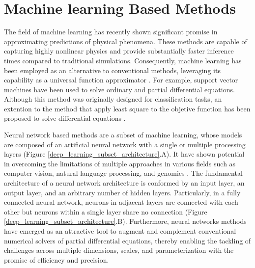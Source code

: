 \documentclass[11pt,twoside]{article}
\begin{document}
\section{Machine learning Based Methods}\label{sec:machine_learning_methods}

The field of machine learning has recently shown significant promise in approximating predictions of physical 
phenomena. These methods are capable of capturing highly nonlinear physics and provide substantially faster inference 
times compared to traditional simulations. Consequently, machine learning has been employed as an alternative to 
conventional methods, leveraging its capability as a universal function approximator \citep{hornik_approximation_1991}.
For example, support vector machines have been used to solve ordinary and partial differential equations. Although 
this method was originally designed for classification tasks, an extention to the method that apply least square to 
the objetive function has been proposed to solve differential equations \citep{mehrkanoon_approximate_2012,
mehrkanoon_learning_2015}.

Neural network based methods are a subset of machine learning, whose models are composed of an artificial neural 
network with a single or multiple processing layers (Figure \ref{deep_learning_subset_architecture}.A). It have 
shown potential in overcoming the limitations of multiple approaches in various fields such as computer vision, 
natural language processing, and genomics \citep{lecun_deep_2015,goodfellow_deep_2016}. The fundamental architecture 
of a neural network architecture is conformed by an input layer, an output layer, and an arbitrary number of hidden 
layers. Particularly, in a fully connected neural network, neurons in adjacent layers are connected with each other 
but neurons within a single layer share no connection (Figure \ref{deep_learning_subset_architecture}.B). Furthermore, 
neural networks methods have emerged as an attractive tool to augment and complement conventional numerical solvers 
of partial differential equations, thereby enabling the tackling of challenges across multiple dimensions, scales, 
and parameterization with the promise of efficiency and precision. 
\end{document}
